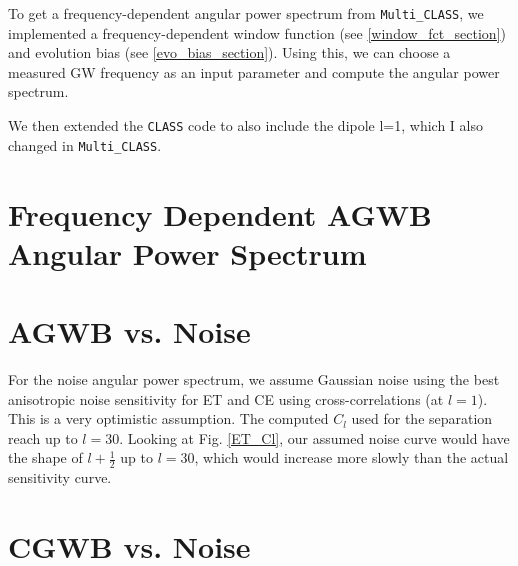 

To get a frequency-dependent angular power spectrum from {\tt Multi\_CLASS}, we implemented a frequency-dependent window function (see \ref{window_fct_section}) and evolution bias (see \ref{evo_bias_section}). Using this, we can choose a measured GW frequency as an input parameter and compute the angular power spectrum.

We then extended the {\tt CLASS} code to also include the dipole l=1, which I also changed in {\tt Multi\_CLASS}.
\section{Frequency Dependent AGWB Angular Power Spectrum}
\section{AGWB vs. Noise}
For the noise angular power spectrum, we assume Gaussian noise using the best anisotropic noise sensitivity for ET and CE using cross-correlations (at $l=1$). This is a very optimistic assumption. The computed $C_l$ used for the separation reach up to $l=30$. Looking at Fig. \ref{ET_Cl}, our assumed noise curve would have the shape of $l+\frac{1}{2}$ up to $l=30$, which would increase more slowly than the actual sensitivity curve. 
\section{CGWB vs. Noise}